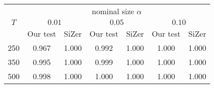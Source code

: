 % 
\begin{tabular}{|c|cc|cc|cc|}
  \hline
  & \multicolumn{6}{|c|}{nominal size $\alpha$} \\
 \cline{2-7} $T$ & \multicolumn{2}{|c|}{$0.01$} & \multicolumn{2}{|c|}{$0.05$} & \multicolumn{2}{|c|}{$0.10$} \\
  & Our test & SiZer & Our test & SiZer & Our test & SiZer \\
 \hline
250 & 0.967 & 1.000 & 0.992 & 1.000 & 1.000 & 1.000 \\ 
  350 & 0.995 & 1.000 & 0.999 & 1.000 & 1.000 & 1.000 \\ 
  500 & 0.998 & 1.000 & 1.000 & 1.000 & 1.000 & 1.000 \\ 
   \hline
\end{tabular}
